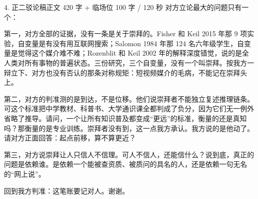 \documentclass[script,pro]{debate}
\begin{document}
\begin{speech}{4. 正二驳论稿}{正文 420 字 + 临场位 100 字 / 120 秒}
对方立论最大的问题只有一个：

第一，对方全部的证据，没有一条是关于崇拜的。Fisher 和 Keil 2015 年那 9 项实验，自变量是有没有用互联网搜索；Salomon 1984 年那 124 名六年级学生，自变量是觉得这个媒介难不难；Rozenblit 和 Keil 2002 年的解释深度错觉，说的是全人类对所有事物的普遍状态。三份研究，三个自变量，没有一个叫崇拜。按我方一辩立下、对方也没有否认的那条对称规矩：短视频媒介的毛病，不能记在崇拜头上。

第二，对方的判准测的是到达，不是位移。他们说崇拜者不能独立复述推理链条。可这个标准把中学教材、科普书、大学通识课全都判成了负分，因为它们无一例外省略了推导。请问，一个让所有知识普及都变成“更远”的标准，衡量的还是真知吗？那衡量的是专业训练。崇拜者没有到，这一点我方承认。我方说的是他动了。请对方正面回答：起点前移，算不算更近？

第三，对方说崇拜让人只信人不信理。可人不信人，还能信什么？说到底，真正的问题是依赖谁。是依赖一个能被查资质、被质问的具名的人，还是依赖一句无名的“网上说”。


回到我方判准：这笔账要记对人。谢谢。

\begin{contingency}
\end{contingency}
\end{speech}
\end{document}
